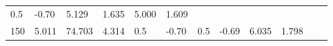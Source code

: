 \documentclass{article}
\begin{document}
\begin{longtable}[]{@{}llllllllllll@{}}
\begin{minipage}[t]{0.03\columnwidth}
0.5\strut
\end{minipage} & \begin{minipage}[t]{0.06\columnwidth}\raggedright\strut
-0.70\strut
\end{minipage} & \begin{minipage}[t]{0.06\columnwidth}\raggedright\strut
5.129\strut
\end{minipage} & \begin{minipage}[t]{0.08\columnwidth}\raggedright\strut
1.635\strut
\end{minipage} & \begin{minipage}[t]{0.06\columnwidth}\raggedright\strut
5.000\strut
\end{minipage} & \begin{minipage}[t]{0.09\columnwidth}\raggedright\strut
1.609\strut
\end{minipage}\tabularnewline
\begin{minipage}[t]{0.03\columnwidth}\raggedright\strut
150\strut
\end{minipage} & \begin{minipage}[t]{0.06\columnwidth}\raggedright\strut
5.011\strut
\end{minipage} & \begin{minipage}[t]{0.06\columnwidth}\raggedright\strut
74.703\strut
\end{minipage} & \begin{minipage}[t]{0.08\columnwidth}\raggedright\strut
4.314\strut
\end{minipage} & \begin{minipage}[t]{0.03\columnwidth}\raggedright\strut
0.5\strut
\end{minipage} & \begin{minipage}[t]{0.06\columnwidth}\raggedright\strut
-0.70\strut
\end{minipage} & \begin{minipage}[t]{0.03\columnwidth}\raggedright\strut
0.5\strut
\end{minipage} & \begin{minipage}[t]{0.06\columnwidth}\raggedright\strut
-0.69\strut
\end{minipage} & \begin{minipage}[t]{0.06\columnwidth}\raggedright\strut
6.035\strut
\end{minipage} & \begin{minipage}[t]{0.08\columnwidth}\raggedright\strut
1.798\strut
\end{minipage} & \begin{minipage}[t]{0.06\columnwidth}\raggedright\strut

\end{minipage}
\end{longtable}
\end{document}
